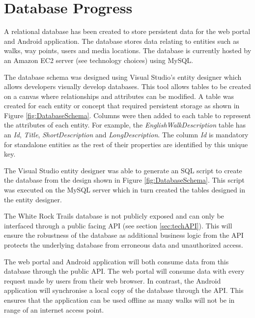 \documentclass[11pt,a4paper]{article}
\begin{document}
\section{Database Progress}

A relational database has been created to store persistent data for the web portal and Android application.
The database stores data relating to entities such as walks, way points, users and media locations.
The database is currently hosted by an Amazon EC2 server (see technology choices) using MySQL.

The database schema was designed using Visual Studio's entity designer which allows developers visually develop databases.
This tool allows tables to be created on a canvas where relationships and attributes can be modified.
A table was created for each entity or concept that required persistent storage as shown in Figure \ref{fig:DatabaseSchema}.
Columns were then added to each table to represent the attributes of each entity.
For example, the \emph{EnglishWalkDescription} table has an \emph{Id}, \emph{Title}, \emph{ShortDescription} and \emph{LongDescription}. The column \emph{Id} is mandatory for standalone entities as the rest of their properties are identified by this unique key. 

The Visual Studio entity designer was able to generate an SQL script to create the database from the design shown in Figure \ref{fig:DatabaseSchema}. This script was executed on the MySQL server which in turn created the tables designed in the entity designer.

The White Rock Trails database is not publicly exposed and can only be interfaced through a public facing API (see section \ref{sec:techAPI}). 
This will ensure the robustness of the database as additional business logic from the API protects the underlying database from erroneous data and unauthorized access.

The web portal and Android application will both consume data from this database through the public API. 
The web portal will consume data with every request made by users from their web browser. 
In contrast, the Android application will synchronise a local copy of the database through the API. 
This ensures that the application can be used offline as many walks will not be in range of an internet access point.
\end{document}
